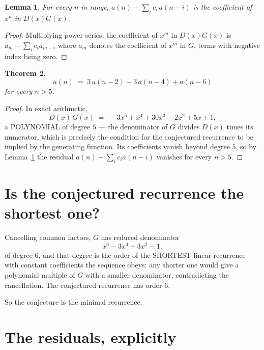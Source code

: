 \documentclass[11pt,a4paper]{article}
\theoremstyle{plain}
\newtheorem{theorem}{Theorem}
\newtheorem{lemma}[theorem]{Lemma}
\theoremstyle{definition}
\begin{document}
\begin{lemma}\label{lem:key}
For every $n$ in range, $a(n)-\sum_i c_i\,a(n-i)$ is the coefficient of $x^{n}$ in
$D(x)G(x)$.
\end{lemma}

\begin{proof}
Multiplying power series, the coefficient of $x^{m}$ in $D(x)G(x)$ is
$a_m-\sum_i c_i a_{m-i}$ where $a_m$ denotes the coefficient of $x^{m}$ in $G$, terms with
negative index being zero.
\end{proof}

\begin{theorem}
\[
a(n)\;=\;3\,a(n-2) - 3\,a(n-4) + a(n-6)
\]
for every $n>5$.
\end{theorem}

\begin{proof}
In exact arithmetic,
\[
D(x)\,G(x)\;=\;- 3 x^{5} + x^{4} + 30 x^{3} - 2 x^{2} + 5 x + 1,
\]
a POLYNOMIAL of degree $5$ --- the denominator of $G$ divides $D(x)$ times its numerator,
which is precisely the condition for the conjectured recurrence to be implied by the
generating function. Its coefficients vanish beyond degree $5$, so by
Lemma~\ref{lem:key} the residual $a(n)-\sum_ic_ia(n-i)$ vanishes for every
$n>5$.
\end{proof}

\section{Is the conjectured recurrence the shortest one?}

Cancelling common factors, $G$ has reduced denominator
\[
x^{6} - 3 x^{4} + 3 x^{2} - 1,
\]
of degree $6$, and that degree is the order of the SHORTEST linear recurrence with
constant coefficients the sequence obeys: any shorter one would give a polynomial multiple of
$G$ with a smaller denominator, contradicting the cancellation. The conjectured recurrence has
order $6$.

So the conjecture is the minimal recurrence.

\section{The residuals, explicitly}
\end{document}
